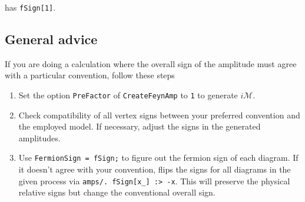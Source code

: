\documentclass[../FeynCalcManual.tex]{subfiles}
\begin{document}
\begin{Shaded}
\begin{Highlighting}[]
\ExtensionTok{=}\OperatorTok{[}\OperatorTok{[}\OperatorTok{,}  \OtherTok{{-}\textgreater{}} \OperatorTok{],} \OperatorTok{\{}\OperatorTok{[}\OperatorTok{,} \OperatorTok{\{}\OperatorTok{\}],} \SpecialCharTok{{-}}\OperatorTok{[}\OperatorTok{,} \OperatorTok{\{}\OperatorTok{\}]\}} \OtherTok{{-}\textgreater{}} 
\OperatorTok{\{}\SpecialCharTok{{-}}\OperatorTok{[}\OperatorTok{,} \OperatorTok{\{}\OperatorTok{\}],} \OperatorTok{[}\OperatorTok{,} \OperatorTok{\{}\OperatorTok{\}]\},}\OtherTok{{-}\textgreater{}} \OperatorTok{\{}\OperatorTok{\},}\OtherTok{{-}\textgreater{}}\OperatorTok{]}\NormalTok{;}
\OperatorTok{[}\OperatorTok{,}\OtherTok{{-}\textgreater{}}\OperatorTok{]}
\end{Highlighting}
\end{Shaded}

has \texttt{fSign[\allowbreak{}1]}.

\subsection{General advice}\label{general-advice}

If you are doing a calculation where the overall sign of the amplitude
must agree with a particular convention, follow these steps

\begin{enumerate}
\def\labelenumi{\arabic{enumi}.}
\tightlist
\item
  Set the option \texttt{PreFactor} of \texttt{CreateFeynAmp} to
  \texttt{1} to generate \(i \mathcal{M}\).
\item
  Check compatibility of all vertex signs between your preferred
  convention and the employed model. If necessary, adjust the signs in
  the generated amplitudes.
\item
  Use \texttt{FermionSign = fSign;} to figure out the fermion sign of
  each diagram. If it doesn't agree with your convention, flips the
  signs for all diagrams in the given process via
  \texttt{amps/. fSign[\allowbreak{}x_] :> -x}. This will preserve the
  physical relative signs but change the conventional overall sign.
\end{enumerate}
\end{document}
